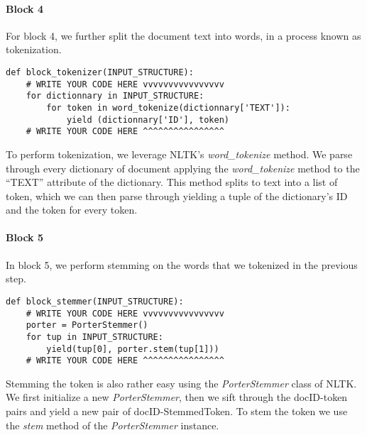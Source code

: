 \documentclass[]{report}
\begin{document}
\paragraph{Block 4}
For block 4, we further split the document text into words, in a process known as tokenization.
\begin{verbatim}
def block_tokenizer(INPUT_STRUCTURE):
	# WRITE YOUR CODE HERE vvvvvvvvvvvvvvvv
	for dictionnary in INPUT_STRUCTURE:
		for token in word_tokenize(dictionnary['TEXT']):
			yield (dictionnary['ID'], token)
	# WRITE YOUR CODE HERE ^^^^^^^^^^^^^^^^
\end{verbatim}
To perform tokenization, we leverage NLTK's \textit{word\_tokenize} method. We parse through every dictionary of document applying the \textit{word\_tokenize} method to the ``TEXT'' attribute of the dictionary. This method splits to text into a list of token, which we can then parse through yielding a tuple of the dictionary's ID and the token for every token.

\paragraph{Block 5}
In block 5, we perform stemming on the words that we tokenized in the previous step.
\begin{verbatim}
def block_stemmer(INPUT_STRUCTURE):
	# WRITE YOUR CODE HERE vvvvvvvvvvvvvvvv
	porter = PorterStemmer()
	for tup in INPUT_STRUCTURE:
		yield(tup[0], porter.stem(tup[1]))
	# WRITE YOUR CODE HERE ^^^^^^^^^^^^^^^^
\end{verbatim}
Stemming the token is also rather easy using the \textit{PorterStemmer} class of NLTK. We first initialize a new \textit{PorterStemmer}, then we sift through the docID-token pairs and yield a new pair of docID-StemmedToken. To stem the token we use the \textit{stem} method of the \textit{PorterStemmer} instance.
\end{document}
